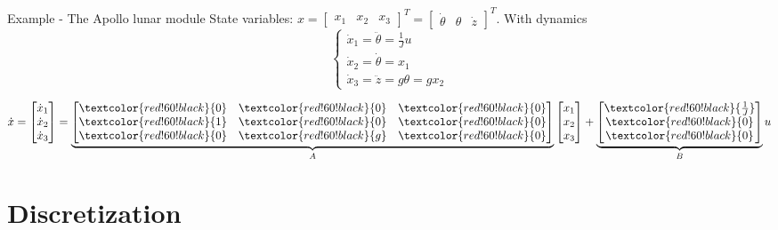 \documentclass[presentation,aspectratio=1610]{beamer}
\begin{document}
\begin{frame}[label={sec:orgd51ff9a}]{Example - The Apollo lunar module}
State variables: \(x = \begin{bmatrix} x_1 & x_2 & x_3 \end{bmatrix}^T = \begin{bmatrix} \dot{\theta} & \theta & \dot{z} \end{bmatrix}^T\). With dynamics
\[ \begin{cases} \dot{x}_1 =  \ddot{\theta} = \frac{1}{J} u\\ \dot{x}_2 = \dot{\theta} = x_1\\ \dot{x}_3 = \ddot{z} = g\theta = gx_2 \end{cases} \]

\[ \dot{x} = \begin{bmatrix} \dot{x}_1\\\dot{x}_2\\\dot{x}_3\end{bmatrix} = \underbrace{\begin{bmatrix} \textcolor{red!60!black}{0} & \textcolor{red!60!black}{0} &\textcolor{red!60!black}{0} \\\textcolor{red!60!black}{1} & \textcolor{red!60!black}{0}& \textcolor{red!60!black}{0}\\ \textcolor{red!60!black}{0}& \textcolor{red!60!black}{g} &\textcolor{red!60!black}{0} \end{bmatrix}}_{A} \begin{bmatrix} x_1\\x_2\\x_3\end{bmatrix} + \underbrace{\begin{bmatrix} \textcolor{red!60!black}{\frac{1}{J}} \\ \textcolor{red!60!black}{0} \\\textcolor{red!60!black}{0}  \end{bmatrix}}_{B} u \]
\end{frame}

\section{Discretization}
\label{sec:org1f5260c}
\end{document}
